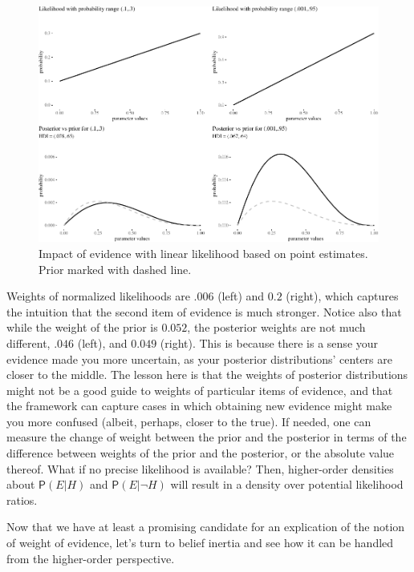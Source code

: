 \documentclass[
  10pt,
  dvipsnames,enabledeprecatedfontcommands]{scrartcl}
\newcommand{\n}{\neg}
\newcommand{\pr}[1]{\mathsf{P}(#1)}
\begin{document}
\begin{figure}[H]

\begin{center}\includegraphics[width=1\linewidth]{impreciseEpistemicFINAL_files/figure-latex/fig:likelihood-1} \end{center}
\caption{Impact of evidence with linear likelihood based on point estimates. Prior marked with dashed line.}
\label{fig:likelihood}
\end{figure}

Weights of normalized likelihoods are \(.006\) (left) and \(0.2\)
(right), which captures the intuition that the second item of evidence
is much stronger. Notice also that while the weight of the prior is
\(0.052\), the posterior weights are not much different, \(.046\)
(left), and \(0.049\) (right). This is because there is a sense your
evidence made you more uncertain, as your posterior distributions'
centers are closer to the middle. The lesson here is that the weights of
posterior distributions might not be a good guide to weights of
particular items of evidence, and that the framework can capture cases
in which obtaining new evidence might make you more confused (albeit,
perhaps, closer to the true). If needed, one can measure the change of
weight between the prior and the posterior in terms of the difference
between weights of the prior and the posterior, or the absolute value
thereof. What if no precise likelihood is available? Then, higher-order
densities about \(\pr{E \vert H}\) and \(\pr{E\vert \n H}\) will result
in a density over potential likelihood ratios.

Now that we have at least a promising candidate for an explication of
the notion of weight of evidence, let's turn to belief inertia and see
how it can be handled from the higher-order perspective.
\end{document}
